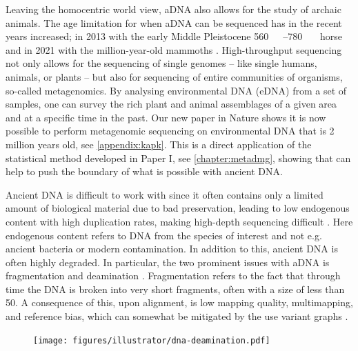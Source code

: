 Leaving the homocentric world view, aDNA also allows for the study of archaic animals. The age limitation for when aDNA can be sequenced has in the recent years increased; in 2013 with the early Middle Pleistocene \qtyrange[range-phrase = --,range-units = single]{560}{780}{\kilo\year\BP} horse \autocite{orlandoRecalibratingEquusEvolution2013} and in 2021 with the million-year-old mammoths \autocite{vandervalkMillionyearoldDNASheds2021}. High-throughput sequencing not only allows for the sequencing of single genomes -- like single humans, animals, or plants -- but also for sequencing of entire communities of organisms, so-called metagenomics. By analysing environmental DNA (eDNA) from a set of samples, one can survey the rich plant and animal assemblages of a given area and at a specific time in the past. Our new paper in Nature shows it is now possible to perform metagenomic sequencing on environmental DNA that is 2 million years old, see \autoref{appendix:kapk}. This is a direct application of the statistical method developed in Paper I, see \autoref{chapter:metadmg}, showing that \metaDMG can help to push the boundary of what is possible with ancient DNA.

Ancient DNA is difficult to work with since it often contains only a limited amount of biological material due to bad preservation, leading to low endogenous content with high duplication rates, making high-depth sequencing difficult \autocite{renaudAuthenticationAssessmentContamination2019}. Here endogenous content refers to DNA from the species of interest and not e.g. ancient bacteria or modern contamination.
In addition to this, ancient DNA is often highly degraded. In particular, the two prominent issues with aDNA is fragmentation and deamination \autocite{dabneyAncientDNADamage2013,peyregnePresentDayDNAContamination2020,}. Fragmentation refers to the fact that through time the DNA is broken into very short fragments, often with a size of less than \SI{50}{\basepairs}.
A consequence of this, upon alignment, is low mapping quality, multimapping, and reference bias, which can somewhat be mitigated by the use variant graphs \autocite{martinianoRemovingReferenceBias2020}.

\begin{figure}[htbp]
    \centering
    \texttt{[image: figures/illustrator/dna-deamination.pdf]}
\end{figure}


